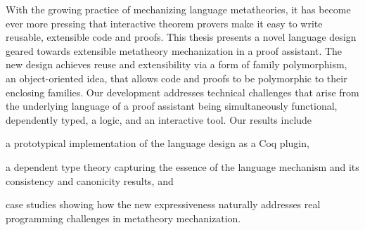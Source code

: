 
With the growing practice of mechanizing language metatheories,
it has become ever more pressing that interactive theorem provers 
make it easy to write reusable, extensible code and proofs.
%
This thesis presents a novel language design geared towards extensible metatheory
mechanization in a proof assistant.
The new design achieves reuse and extensibility via a form of family
polymorphism, an object-oriented idea, that allows code and
proofs to be polymorphic to their enclosing families.
Our development addresses technical challenges that arise
from the underlying language of a proof assistant being simultaneously
functional, dependently typed, a logic, and an interactive tool.
%
Our results include
\begin{enumerate*}
\item a prototypical implementation of the language design as a Coq plugin,
\item a dependent type theory capturing the essence of the language mechanism
      and its consistency and canonicity results,
and 
\item case studies showing how the new expressiveness naturally addresses real
programming challenges in metatheory mechanization.
\end{enumerate*}


